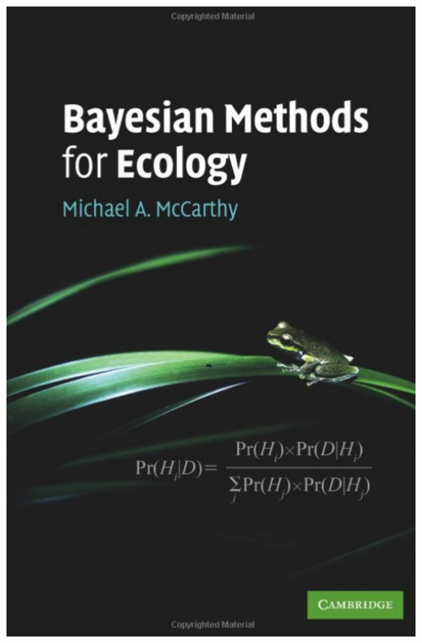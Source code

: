 \documentclass[
  ignorenonframetext,
  aspectratio=169]{beamer}
\begin{document}
\begin{frame}
\begin{center}\includegraphics[width=6.88in]{img/mccarthy} \end{center}
\end{frame}
\end{document}
